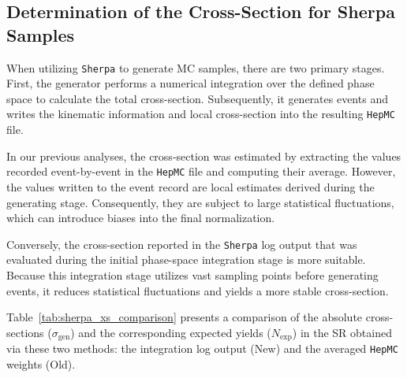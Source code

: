 \documentclass[12pt]{article}
\begin{document}



    \subsection{Determination of the Cross-Section for Sherpa Samples}%
    \label{sub:what_cross_section_should_be_used_in_sherpa_samples}

        When utilizing \verb|Sherpa| to generate MC samples, there are two primary stages. First, the generator performs a numerical integration over the defined phase space to calculate the total cross-section. Subsequently, it generates events and writes the kinematic information and local cross-section into the resulting \verb|HepMC| file.

        In our previous analyses, the cross-section was estimated by extracting the values recorded event-by-event in the \verb|HepMC| file and computing their average. However, the values written to the event record are local estimates derived during the generating stage. Consequently, they are subject to large statistical fluctuations, which can introduce biases into the final normalization.

        Conversely, the cross-section reported in the \verb|Sherpa| log output that was evaluated during the initial phase-space integration stage is more suitable. Because this integration stage utilizes vast sampling points before generating events, it reduces statistical fluctuations and yields a more stable cross-section.

        Table~\ref{tab:sherpa_xs_comparison} presents a comparison of the absolute cross-sections ($\sigma_{\text{gen}}$) and the corresponding expected yields ($N_{\text{exp}}$) in the SR obtained via these two methods: the integration log output (New) and the averaged \verb|HepMC| weights (Old).
\end{document}
